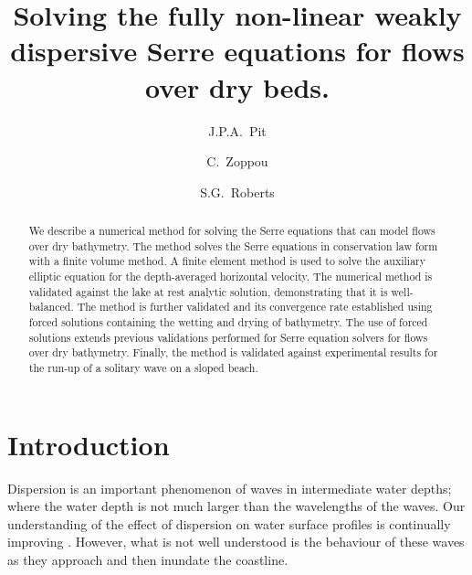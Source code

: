\documentclass[AMA,STIX1COL]{WileyNJD-v2}
\begin{document}
\title{Solving the fully non-linear weakly dispersive Serre equations for flows over dry beds.}

\author[ANU]{J.P.A.~Pit}
\author[ANU]{C.~Zoppou}
\author[ANU]{S.G.~Roberts}

\address[ANU]{, , }
 
 \begin{abstract}
 	We describe a numerical method for solving the Serre equations that can model flows over dry bathymetry. The method solves the Serre equations in conservation law form with a finite volume method. A finite element method is used to solve the auxiliary elliptic equation for the depth-averaged horizontal velocity. The numerical method is validated against the lake at rest analytic solution, demonstrating that it is well-balanced. The method is further validated and its convergence rate established using forced solutions containing the wetting and drying of bathymetry. The use of forced solutions extends previous validations performed for Serre equation solvers for flows over dry bathymetry. Finally, the method is validated against experimental results for the run-up of a solitary wave on a sloped beach.

 \end{abstract}	
 
  
\maketitle
\linenumbers
\section{Introduction} \label{intro} 


Dispersion is an important phenomenon of waves in intermediate water depths; where the water depth is not much larger than the wavelengths of the waves. Our understanding of the effect of dispersion on water surface profiles is continually improving \cite{Pitt-2018-61}. However, what is not well understood is the behaviour of these waves as they approach and then inundate the coastline. 
\end{document}
